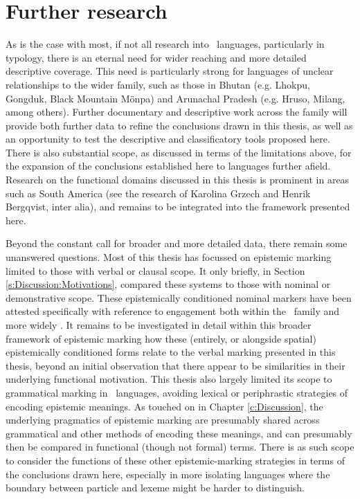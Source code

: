 \section{Further research}
As is the case with most, if not all research into \lfam\ languages, particularly in typology, there is an eternal need for wider reaching and more detailed descriptive coverage. This need is particularly strong for languages of unclear relationships to the wider family, such as those in Bhutan (e.g. Lhokpu, Gongduk, Black Mountain Mönpa) and Arunachal Pradesh (e.g. Hruso, Milang, among others). Further documentary and descriptive work across the family will provide both further data to refine the conclusions drawn in this thesis, as well as an opportunity to test the descriptive and classificatory tools proposed here. There is also substantial scope, as discussed in terms of the limitations above, for the expansion of the conclusions established here to languages further afield. Research on the functional domains discussed in this thesis is prominent in areas such as South America (see the research of Karolina Grzech and Henrik Bergqvist, inter alia), and remains to be integrated into the framework presented here.

Beyond the constant call for broader and more detailed data, there remain some unanswered questions. Most of this thesis has focussed on epistemic marking limited to those with verbal or clausal scope. It only briefly, in Section \ref{s:Discussion:Motivations}, compared these systems to those with nominal or demonstrative scope. These epistemically conditioned nominal markers have been attested specifically with reference to engagement both within the \lfam\ family \cite{GonzalezPerez2022} and more widely \cites{EvansBergqvistSanRoque2018a}{EvansBergqvistSanRoque2018b}. It remains to be investigated in detail within this broader framework of epistemic marking how these (entirely, or alongside spatial) epistemically conditioned forms relate to the verbal marking presented in this thesis, beyond an initial observation that there appear to be similarities in their underlying functional motivation. This thesis also largely limited its scope to grammatical marking in \lfam\ languages, avoiding lexical or periphrastic strategies of encoding epistemic meanings. As touched on in Chapter \ref{c:Discussion}, the underlying pragmatics of epistemic marking are presumably shared across grammatical and other methods of encoding these meanings, and can presumably then be compared in functional (though not formal) terms. There is as such scope to consider the functions of these other epistemic-marking strategies in terms of the conclusions drawn here, especially in more isolating languages where the boundary between particle and lexeme might be harder to distinguish.